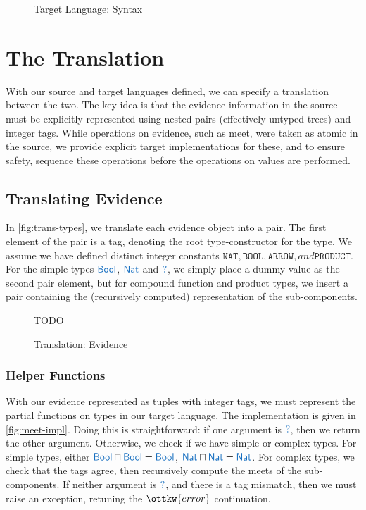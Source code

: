 \documentclass[11pt]{article}
\newcommand{\blue}[1]{ {\color{RoyalBlue}{{#1}}} }
\begin{document}
\begin{figure}[H]
	\caption{Target Language: Syntax}
	\label{fig:target-syntax}
\end{figure}

\section{The Translation} 

With our source and target languages defined, we can specify a translation between the two.
The key idea is that the evidence information in the source must be explicitly represented
using nested pairs (effectively untyped trees) and integer tags. While operations on evidence,
such as meet, were taken as atomic in the source, we provide explicit target implementations for these,
and to ensure safety, sequence these operations before the operations on values are performed.

\subsection{Translating Evidence}

In \autoref{fig:trans-types}, we translate each evidence object into a pair.
The first element of the pair is a tag, denoting the root type-constructor for the type.
We assume we have defined distinct integer constants $ \mathtt{NAT } ,  \mathtt{BOOL } ,  \mathtt{ARROW } , and  \mathtt{PRODUCT } $.
For the simple types $ \blue{\mathsf{Bool} } $, $ \blue{\mathsf{Nat} } $ and $ \blue{?} $, we simply place a dummy value as the second pair element,
but for compound function and product types, we insert a pair containing the (recursively computed) representation
of the sub-components. 

\begin{figure}[H] TODO  
	\ottdefnEvTransform
	\caption{Translation: Evidence}
	\label{fig:trans-types}
\end{figure}

\subsubsection{Helper Functions}

With our evidence represented as tuples with integer tags, we must represent the partial functions
on types in our target language.
The implementation is given in \autoref{fig:meet-impl}.
Doing this is straightforward: if one argument is $ \blue{?} $,
then we return the other argument. Otherwise, we check if we have simple or complex types.
For simple types, either $  \blue{\mathsf{Bool} }   \sqcap   \blue{\mathsf{Bool} }   =   \blue{\mathsf{Bool} }  $, $  \blue{\mathsf{Nat} }   \sqcap   \blue{\mathsf{Nat} }   =   \blue{\mathsf{Nat} }  $.
For complex types, we check that the tags agree, then recursively compute the meets of the sub-components.
If neither argument is $ \blue{?} $, and there is a tag mismatch, then we must raise an exception, retuning the $\ottkw{error}$
continuation.
\end{document}
